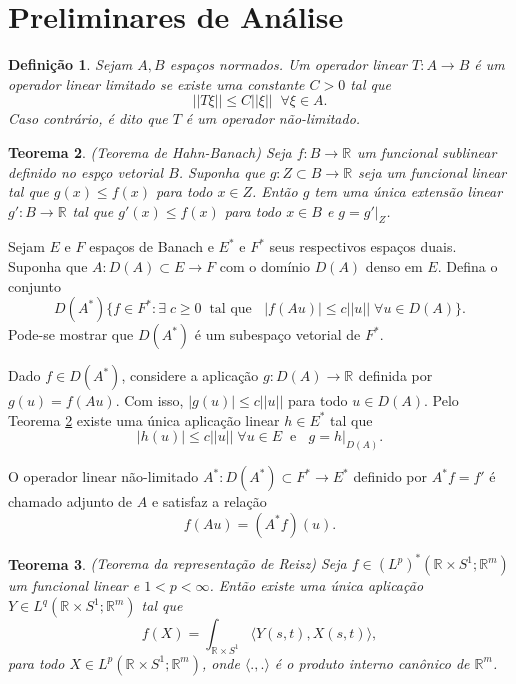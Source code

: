 \documentclass[12pt]{book}
\newtheorem{teorema}{Teorema}[section]
\newtheorem{definicao}[teorema]{Definição}
\newcommand{\circulo}{S^{1}}
\newcommand{\espacoLpcontradominio}[2]{L^{p}(#1;#2)}
\newcommand{\espacoLpadjuntoretacirculo}{L^{q}(\retacartesianocirculo;\real{m})}
\newcommand{\espacoLpdual}{(L^{p})^{*}(\retacartesianocirculo;\real{m})}
\newcommand{\norma}[1]{||#1||}
\newcommand{\produtointerno}[2]{\langle #1, #2 \rangle}
\newcommand{\retacartesianocirculo}{\real{} \times \circulo}
\newcommand{\real}[1]{\mathbb{R}^{#1}}
\newcommand{\reta}{\real{}}
\begin{document}
	\section{Preliminares de Análise}\label{apendice_preliminares_analise}
	\begin{definicao}
		Sejam $A,B$ espaços normados. Um operador linear $T:A\to B$ é um operador linear limitado se existe uma constante $C>0$ tal que
		$$
		\norma{T\xi} \leq C\norma{\xi}\;\;\forall \xi \in A.
		$$
		Caso contrário, é dito que $T$ é um operador não-limitado.
	\end{definicao}
	
	\begin{teorema}\label{teorema_hahn_banach}
		(Teorema de Hahn-Banach) Seja $f:B \to \reta$ um funcional sublinear definido no espço vetorial $B$. Suponha que $g:Z \subset B \to \reta$ seja um funcional linear tal que $g(x)\leq f(x)$ para todo $x \in Z$. Então $g$ tem uma única extensão linear $g': B \to \reta$ tal que $g'(x)\leq f(x)$ para todo $x \in B$ e $g=g'|_{Z}$.
	\end{teorema}
	
	Sejam $E$ e $F$ espaços de Banach e $E^{*}$ e $F^{*}$ seus respectivos espaços duais. Suponha que $A: D(A)\subset E\to F$ com o domínio $D(A)$ denso em $E$. Defina o conjunto 
	$$
	D(A^{*})\{ f\in F^{*}: \exists\;c\geq 0\;\;\text{tal que }\;\; |f(Au)|\leq c\norma{u}\;\forall u\in D(A)\}.
	$$
	Pode-se mostrar que $D(A^{*})$ é um subespaço vetorial de $F^{*}$.
	
	Dado $f\in D(A^{*})$, considere a aplicação $g:D(A)\to \reta$ definida por $g(u) = f(Au)$. Com isso, $|g(u)|\leq c\norma{u}$ para todo $u\in D(A)$. Pelo Teorema \ref{teorema_hahn_banach} existe uma única aplicação linear $h\in E^{*}$ tal que 
	$$
	|h(u)|\leq c\norma{u} \;\forall u \in E \;\;\text{e }\;\; g=h|_{D(A)}.
	$$
	
	O operador linear não-limitado $A^{*}:D(A^{*})\subset F^{*}\to E^{*}$ definido por $A^{*}f=f'$ é chamado adjunto de $A$ e satisfaz a relação
	$$
	f(Au) = (A^{*}f)(u).
	$$
	
	\begin{teorema}\label{teorema_representacao_reiz}
		(Teorema da representação de Reisz) Seja $f \in \espacoLpdual$ um funcional linear e $1<p<\infty$. Então existe uma única aplicação $Y \in \espacoLpadjuntoretacirculo$ tal que
		$$
		f(X) = \int_{\retacartesianocirculo}\produtointerno{Y(s,t)}{X(s,t)},
		$$
		para todo $X \in \espacoLpcontradominio{\retacartesianocirculo}{\real{m}}$, onde $\produtointerno{.}{.}$ é o produto interno canônico de $\real{m}$.
	\end{teorema}
	
\end{document}
